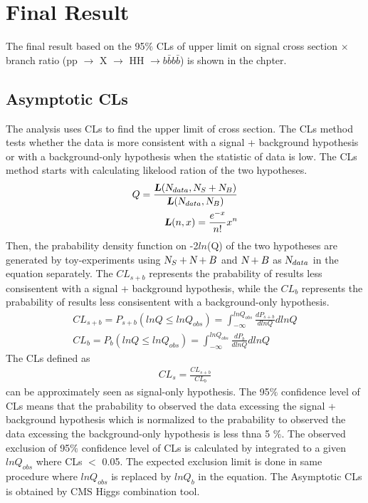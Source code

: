 \chapter{Final Result} \label{chap:6}

The final result based on the 95$\% $ CLs of upper limit on signal cross section $\times $ branch ratio (pp $\rightarrow$ X $\rightarrow$ HH $\rightarrow b\bar{b}b\bar{b}$) is shown in the chpter.

\section{Asymptotic CLs} 
The analysis uses CLs to find the upper limit of cross section\citep{0954-3899-28-10-313,NicolasChanon}. The CLs method tests whether the data is more consistent with a signal + background hypothesis or with a background-only hypothesis when the statistic of data is low. The CLs method starts with calculating likelood ration of the two hypotheses. 
\begin{equation} \label{eq1}
\begin{split}
Q = \frac{\textbf{\textsl{L}}(\textsl{N}_{data},\textsl{N}_{S}+\textsl{N}_{B})}{\textbf{\textsl{L}}(\textsl{N}_{data},\textsl{N}_{B})}\\
\textbf{\textsl{L}}(n,x) = \frac{e^{-x}}{n!}x^n
\end{split}
\end{equation}
Then, the prabability density function on -2$\textit{ln}$(Q) of the two hypotheses are generated by toy-experiments using $\textsl{N}_{S} + \textsl{N}+{B}$ and $\textsl{N}+{B}$ as $\textsl{N}_{data}$ in the equation separately. The $CL_{s+b}$ represents the prabability of results less consisentent with a signal + background hypothesis, while the $CL_{b}$ represents the prabability of results less consisentent with a background-only hypothesis.
\begin{equation} \label{eq1}
\begin{split}
CL_{s+b} = P_{s+b}(lnQ \leq lnQ_{obs}) = \int^{lnQ_{obs}}_{-\infty} \frac{dP_{s+b}}{dlnQ} dlnQ \\
CL_{b} = P_{b}(lnQ \leq lnQ_{obs}) = \int^{lnQ_{obs}}_{-\infty} \frac{dP_{b}}{dlnQ} dlnQ
\end{split}
\end{equation}
The CLs defined as 
\begin{equation} \label{eq1}
\begin{split}
CL_{s} = \frac{CL_{s+b}}{CL_{b}}
\end{split}
\end{equation}
can be approximately seen as signal-only hypothesis. The 95$\% $ confidence level of CLs means that the prabability to observed the data excessing the signal + background hypothesis which is normalized to the prabability to observed the data excessing the background-only hypothesis is less thna 5 $\% $. The observed  exclusion of 95$\% $ confidence level of CLs is calculated by integrated to a given $lnQ_{obs}$ where CLs $<$ 0.05. The expected exclusion limit is done in same procedure where $lnQ_{obs}$ is replaced by $lnQ_{b}$ in the equation. The Asymptotic CLs is obtained by CMS Higgs combination tool\citep{higgsCombine}.

